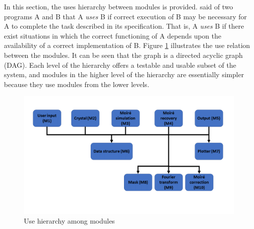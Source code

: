 \documentclass[12pt, titlepage]{article}
\begin{document}
In this section, the uses hierarchy between modules is
provided. \cite{Parnas1978} said of two programs A and B that A {\em uses} B if
correct execution of B may be necessary for A to complete the task described in
its specification. That is, A {\em uses} B if there exist situations in which
the correct functioning of A depends upon the availability of a correct
implementation of B.  Figure \ref{FigUH} illustrates the use relation between
the modules. It can be seen that the graph is a directed acyclic graph
(DAG). Each level of the hierarchy offers a testable and usable subset of the
system, and modules in the higher level of the hierarchy are essentially simpler
because they use modules from the lower levels.

\begin{figure}[H]
\centering
\includegraphics[width=\linewidth]{Figure_MG_STEMMoireRec.png}
\caption{Use hierarchy among modules}
\label{FigUH}
\end{figure}

\newpage



\end{document}

